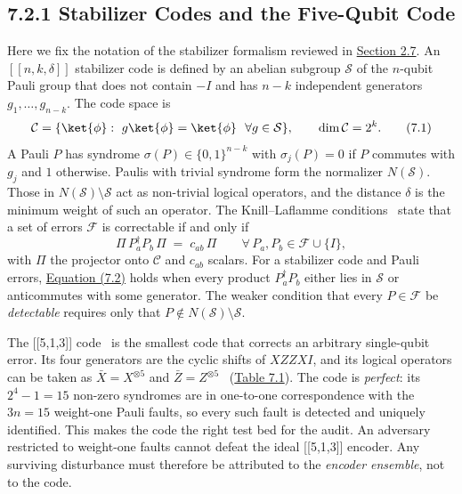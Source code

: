 \documentclass{report}
\theoremstyle{plain}
\theoremstyle{definition}
\theoremstyle{remark}
\begin{document}
\subsection{7.2.1 Stabilizer Codes and the Five-Qubit Code}\label{sec:qec:stabilizer}

Here we fix the notation of the stabilizer formalism reviewed in \hyperref[sec:bg:qec]{Section 2.7}. An $[[n,k,\delta]]$ stabilizer code is defined by an abelian subgroup $\mathcal{S}$ of the $n$-qubit Pauli group that does not contain $-I$ and has $n-k$ independent generators $g_1,\dots,g_{n-k}$. The code space is
\hypertarget{eq:qec:codespace}{}\[
  \mathcal{C}=\{\ket{\phi}:\ g\ket{\phi}=\ket{\phi}\ \ \forall g\in\mathcal{S}\},\qquad \dim\mathcal{C}=2^{k}.
\tag{7.1}\]
A Pauli $P$ has syndrome $\sigma(P)\in\{0,1\}^{n-k}$ with $\sigma_j(P)=0$ if $P$ commutes with $g_j$ and $1$ otherwise. Paulis with trivial syndrome form the normalizer $N(\mathcal{S})$. Those in $N(\mathcal{S})\setminus\mathcal{S}$ act as non-trivial logical operators, and the distance $\delta$ is the minimum weight of such an operator. The Knill--Laflamme conditions~\cite{knill1997theory} state that a set of errors $\mathcal{F}$ is correctable if and only if
\hypertarget{eq:qec:kl}{}\[
  \Pi\,P_a^{\dagger}P_b\,\Pi \;=\; c_{ab}\,\Pi\qquad\forall\,P_a,P_b\in\mathcal{F}\cup\{I\},
\tag{7.2}\]
with $\Pi$ the projector onto $\mathcal{C}$ and $c_{ab}$ scalars. For a stabilizer code and Pauli errors, \hyperref[eq:qec:kl]{Equation (7.2)} holds when every product $P_a^{\dagger}P_b$ either lies in $\mathcal{S}$ or anticommutes with some generator. The weaker condition that every $P\in\mathcal{F}$ be \emph{detectable} requires only that $P\notin N(\mathcal{S})\setminus\mathcal{S}$.

The [[5,1,3]] code~\cite{laflamme1996perfect,bennett1996mixed} is the smallest code that corrects an arbitrary single-qubit error. Its four generators are the cyclic shifts of $XZZXI$, and its logical operators can be taken as $\bar X=X^{\otimes 5}$ and $\bar Z=Z^{\otimes 5}$~\cite{nielsen2010qcqi} (\hyperref[tab:qec:code513]{Table 7.1}). The code is \emph{perfect}: its $2^{4}-1=15$ non-zero syndromes are in one-to-one correspondence with the $3n=15$ weight-one Pauli faults, so every such fault is detected and uniquely identified. This makes the code the right test bed for the audit. An adversary restricted to weight-one faults cannot defeat the ideal [[5,1,3]] encoder. Any surviving disturbance must therefore be attributed to the \emph{encoder ensemble}, not to the code.
\end{document}
